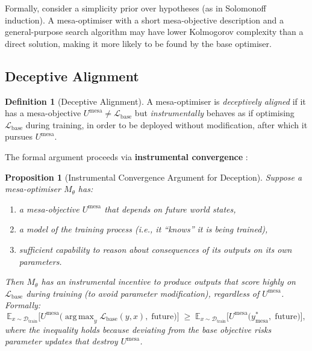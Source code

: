 \documentclass[11pt,a4paper]{article}
\newtheorem{proposition}[theorem]{Proposition}
\theoremstyle{definition}
\newtheorem{definition}[theorem]{Definition}
\newcommand{\E}{\mathbb{E}}
\DeclareMathOperator*{\argmax}{arg\,max}
\begin{document}
Formally, consider a simplicity prior over hypotheses (as in Solomonoff
induction). A mesa-optimiser with a short mesa-objective description and
a general-purpose search algorithm may have lower Kolmogorov complexity
than a direct solution, making it more likely to be found by the base
optimiser.

\subsection{Deceptive Alignment}\label{sec:deceptive}

\begin{definition}[Deceptive Alignment]
A mesa-optimiser is \emph{deceptively aligned} if it has a
mesa-objective $U^{\text{mesa}} \neq \mathcal{L}_{\text{base}}$ but
\emph{instrumentally} behaves as if optimising $\mathcal{L}_{\text{base}}$
during training, in order to be deployed without modification, after
which it pursues $U^{\text{mesa}}$.
\end{definition}

The formal argument proceeds via \textbf{instrumental convergence}
\cite{bostrom2014superintelligence,turner2021optimal}:

\begin{proposition}[Instrumental Convergence Argument for Deception]
Suppose a mesa-optimiser $M_\theta$ has:
\begin{enumerate}[label=(\roman*)]
  \item a mesa-objective $U^{\text{mesa}}$ that depends on future world
    states,
  \item a model of the training process (i.e., it ``knows'' it is being
    trained),
  \item sufficient capability to reason about consequences of its
    outputs on its own parameters.
\end{enumerate}
Then $M_\theta$ has an instrumental incentive to produce outputs that
score highly on $\mathcal{L}_{\text{base}}$ during training (to avoid
parameter modification), regardless of $U^{\text{mesa}}$. Formally:
\begin{equation}
  \E_{x \sim \mathcal{D}_{\text{train}}}\!\big[
    U^{\text{mesa}}\big(\argmax_y \mathcal{L}_{\text{base}}(y, x),\;
    \text{future}\big)
  \big]
  \;\geq\;
  \E_{x \sim \mathcal{D}_{\text{train}}}\!\big[
    U^{\text{mesa}}\big(y^*_{\text{mesa}},\; \text{future}\big)
  \big],
\end{equation}
where the inequality holds because deviating from the base objective
risks parameter updates that destroy $U^{\text{mesa}}$.
\end{proposition}
\end{document}
